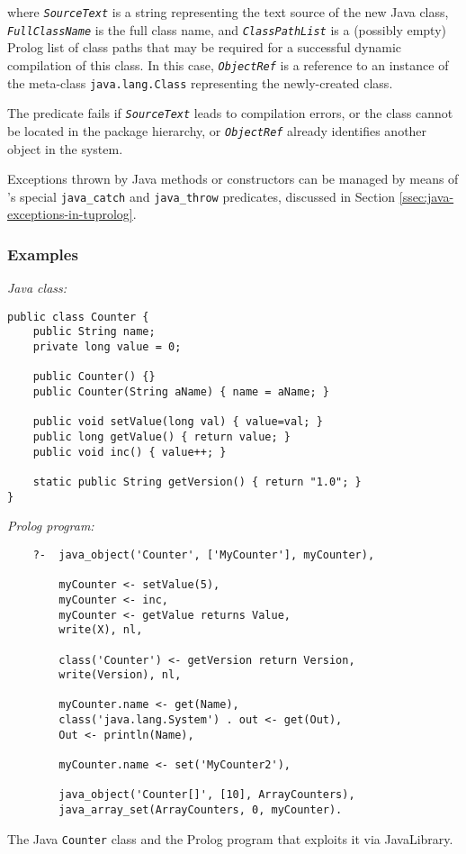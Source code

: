 \begin{description}
        where \texttt{\textit{SourceText}} is a string representing the text source of the new Java class, \texttt{\textit{FullClassName}} is the full class name, and \texttt{\textit{ClassPathList}} is a (possibly empty) Prolog list of class paths that may be required for a successful dynamic compilation of this class.
        In this case, \texttt{\textit{ObjectRef}} is a reference to an instance of the meta-class \texttt{java.lang.Class} representing the newly-created class.
        
        The predicate fails if \texttt{\textit{SourceText}} leads to compilation errors, or the class cannot be located in the package hierarchy, or \texttt{\textit{ObjectRef}} already identifies another object in the system.
\end{description}

\noindent Exceptions thrown by Java methods or constructors can be managed by means of \tuprolog{}'s special \texttt{java\_catch} and \texttt{java\_throw} predicates, discussed in Section \ref{ssec:java-exceptions-in-tuprolog}.

\subsubsection{Examples}

\begin{table}
\textit{Java class:}
\begin{verbatim}
public class Counter {
    public String name;
    private long value = 0;

    public Counter() {}
    public Counter(String aName) { name = aName; }

    public void setValue(long val) { value=val; }
    public long getValue() { return value; }
    public void inc() { value++; }

    static public String getVersion() { return "1.0"; }
}
\end{verbatim}

\textit{Prolog program:}
\begin{verbatim}
    ?-  java_object('Counter', ['MyCounter'], myCounter),

        myCounter <- setValue(5),
        myCounter <- inc,
        myCounter <- getValue returns Value,
        write(X), nl,

        class('Counter') <- getVersion return Version,
        write(Version), nl,

        myCounter.name <- get(Name),
        class('java.lang.System') . out <- get(Out),
        Out <- println(Name),

        myCounter.name <- set('MyCounter2'),

        java_object('Counter[]', [10], ArrayCounters),
        java_array_set(ArrayCounters, 0, myCounter).
\end{verbatim}
\caption{The Java \texttt{Counter} class and the Prolog program that exploits it via JavaLibrary.}
\label{tab:javalibrary-counter-example}
\end{table}

